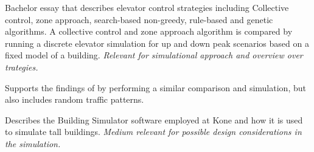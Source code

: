 


Bachelor essay that describes elevator control strategies including
Collective control, zone approach, search-based non-greedy, rule-based and genetic algorithms. A collective control and zone approach algorithm is compared by running a discrete elevator simulation for up and down peak scenarios based on a fixed model of a building. \emph{Relevant for simulational approach and overview over trategies.}


Supports the findings of \textcite{axelsson2013strategies} by performing a similar comparison and simulation, but also includes random traffic patterns. 



Describes the Building Simulator software employed at Kone and how it is used to simulate tall buildings.
\emph{Medium relevant for possible design considerations in the simulation.}

